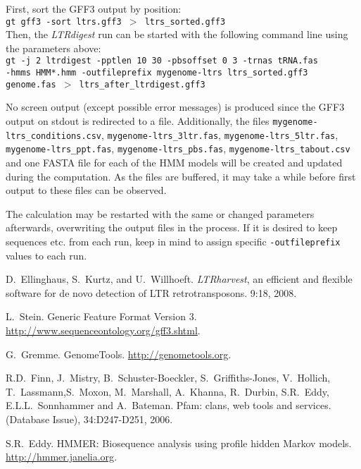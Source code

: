 \documentclass[12pt,titlepage]{article}
\newcommand{\LTRdigest}{\textit{LTRdigest}\xspace}
\begin{document}
First, sort the GFF3 output by position:
\\[0.5cm]
\texttt{gt gff3 -sort ltrs.gff3 $>$ ltrs\_sorted.gff3}
\\[0.5cm]
Then, the \LTRdigest run can be started with the following command line using
the parameters above:
\\[0.5cm]
\texttt{gt -j 2 ltrdigest -pptlen 10 30 -pbsoffset 0 3 -trnas tRNA.fas \\-hmms
HMM*.hmm -outfileprefix mygenome-ltrs ltrs\_sorted.gff3 genome.fas $>$
ltrs\_after\_ltrdigest.gff3}

No screen output (except possible error messages) is produced since the GFF3
output on stdout is redirected to a file. Additionally, the files
\texttt{mygenome\--ltrs\_conditions.csv}, \texttt{mygenome\--ltrs\_3ltr.fas},
\texttt{mygenome\--ltrs\_5ltr.fas}, \texttt{mygenome\--ltrs\_ppt.fas},
\texttt{mygenome\--ltrs\_pbs.fas}, \texttt{mygenome-\-ltrs\_tabout.csv} and one
FASTA file for each of the HMM models will be created and updated during the
computation. As the files are buffered, it may take a while before first output
to these files can be observed.

The calculation may be restarted with the same or changed parameters afterwards,
overwriting the output files in the process. If it is desired to keep sequences
etc. from each run, keep in mind to assign specific \texttt{-outfileprefix}
values to each run.


\begin{thebibliography}{1}

D.~Ellinghaus, S.~Kurtz, and U.~Willhoeft.
\newblock \emph{LTRharvest}, an efficient and flexible software for de novo
detection of \normalsize{LTR} retrotransposons.
 9:18, 2008.

L.~Stein.
\newblock Generic Feature Format Version 3.
  \url{http://www.sequenceontology.org/gff3.shtml}.

G.~Gremme.
\newblock GenomeTools.
  \url{http://genometools.org}.

R.D.~Finn, J.~Mistry, B.~Schuster-Boeckler, S.~Griffiths-Jones, V.~Hollich,
T.~Lassmann,S.~Moxon, M.~Marshall, A.~Khanna, R.~Durbin, S.R.~Eddy,
E.L.L.~Sonnhammer and A.~Bateman.
\newblock Pfam: clans, web tools and services.
 (Database Issue), 34:D247-D251, 2006.

S.R.~Eddy.
\newblock HMMER: Biosequence analysis using profile hidden Markov models.
  \url{http://hmmer.janelia.org}.

\end{thebibliography}
\end{document}
